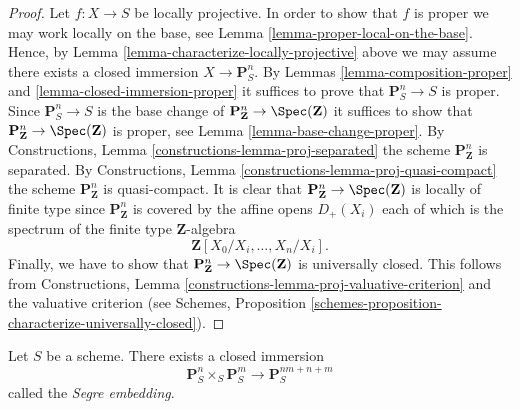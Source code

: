 \begin{proof}
Let $f : X \to S$ be locally projective.
In order to show that $f$ is proper we may work locally on the
base, see Lemma \ref{lemma-proper-local-on-the-base}.
Hence, by Lemma \ref{lemma-characterize-locally-projective}
above we may assume there exists a closed immersion $X \to \mathbf{P}^n_S$.
By Lemmas \ref{lemma-composition-proper}
and \ref{lemma-closed-immersion-proper} it suffices to prove that
$\mathbf{P}^n_S \to S$ is proper. Since
$\mathbf{P}^n_S \to S$ is the base change of
$\mathbf{P}^n_{\mathbf{Z}} \to \Spec(\mathbf{Z})$ it suffices
to show that $\mathbf{P}^n_{\mathbf{Z}} \to \Spec(\mathbf{Z})$
is proper, see Lemma \ref{lemma-base-change-proper}.
By Constructions, Lemma \ref{constructions-lemma-proj-separated} the scheme
$\mathbf{P}^n_{\mathbf{Z}}$ is separated.
By Constructions, Lemma \ref{constructions-lemma-proj-quasi-compact} the scheme
$\mathbf{P}^n_{\mathbf{Z}}$ is quasi-compact.
It is clear that $\mathbf{P}^n_{\mathbf{Z}} \to \Spec(\mathbf{Z})$
is locally of finite type since $\mathbf{P}^n_{\mathbf{Z}}$ is
covered by the affine opens $D_{+}(X_i)$ each of which is the
spectrum of the finite type $\mathbf{Z}$-algebra
$$
\mathbf{Z}[X_0/X_i, \ldots, X_n/X_i].
$$
Finally, we have to show that
$\mathbf{P}^n_{\mathbf{Z}} \to \Spec(\mathbf{Z})$
is universally closed. This follows from
Constructions, Lemma \ref{constructions-lemma-proj-valuative-criterion}
and the valuative criterion (see Schemes,
Proposition \ref{schemes-proposition-characterize-universally-closed}).
\end{proof}

\begin{lemma}
\label{lemma-segre-embedding}
Let $S$ be a scheme. There exists a closed immersion
$$
\mathbf{P}^n_S \times_S \mathbf{P}^m_S
\longrightarrow
\mathbf{P}^{nm + n + m}_S
$$
called the {\it Segre embedding}.
\end{lemma}

